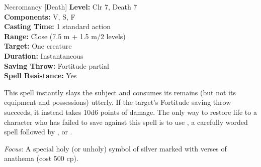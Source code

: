 {Necromancy [Death]}
{
	\textbf{Level:}
	Clr 7, Death 7\\
	\textbf{Components:}
	V, S, F\\
	\textbf{Casting Time:}
	1 standard action\\
	\textbf{Range:}
	Close (7.5 m + 1.5 m/2 levels)\\
	\textbf{Target:}
	One creature\\
	\textbf{Duration:}
	Instantaneous\\
	\textbf{Saving Throw:}
	Fortitude partial\\
	\textbf{Spell Resistance:}
	Yes\\
}
{
	This spell instantly slays the subject and consumes its remains (but not its equipment and possessions) utterly. If the target's Fortitude saving throw succeeds, it instead takes 10d6 points of damage. The only way to restore life to a character who has failed to save against this spell is to use , a carefully worded  spell followed by , or .

	\textit{Focus}:
	A special holy (or unholy) symbol of silver marked with verses of anathema (cost 500 cp).

}
